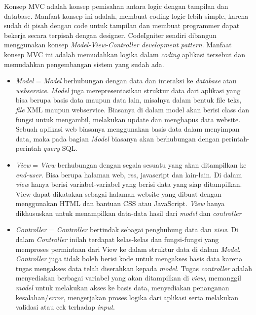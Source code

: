 	Konsep MVC adalah konsep pemisahan antara logic dengan tampilan dan database. Manfaat konsep ini adalah, membuat coding logic lebih simple, karena sudah di pisah dengan code untuk tampilan dan membuat programmer dapat bekerja secara terpisah dengan designer.
	CodeIgniter sendiri dibangun menggunakan konsep \textit{Model-View-Controller development pattern}. Manfaat konsep MVC ini adalah memudahkan logika dalam \textit{coding} aplikasi tersebut dan memudahkan pengembangan sistem yang sudah ada.
	\begin{itemize}
		\item \textit{Model} = \textit{Model} berhubungan dengan data dan interaksi ke \textit{database} atau \textit{webservice}. \textit{Model} juga merepresentasikan struktur data dari aplikasi yang bisa berupa basis data maupun data lain, misalnya dalam bentuk file teks, \textit{file} XML maupun webservice. Biasanya di dalam model akan berisi class dan fungsi untuk mengambil, melakukan update dan menghapus data website. Sebuah
		aplikasi web biasanya menggunakan basis data dalam menyimpan data, maka pada bagian \textit{Model} biasanya akan berhubungan dengan perintah-perintah \textit{query} SQL.
		\item \textit{View} = \textit{View} berhubungan dengan segala sesuatu yang akan ditampilkan ke \textit{end-user}. Bisa berupa halaman web, rss, javascript dan lain-lain. Di dalam \textit{view} hanya berisi variabel-variabel yang berisi data yang siap ditampilkan. View dapat dikatakan sebagai halaman website yang dibuat dengan	menggunakan HTML dan bantuan CSS atau JavaScript. \textit{View} hanya dikhususkan untuk menampilkan data-data hasil dari \textit{model} dan \textit{controller}
		\item \textit{Controller} = \textit{Controller} bertindak sebagai penghubung data dan \textit{view}. Di dalam \textit{Controller} inilah terdapat kelas-kelas dan fungsi-fungsi yang memproses permintaan dari View ke dalam struktur data di dalam \textit{Model}. \textit{Controller} juga tidak boleh berisi kode untuk mengakses basis data karena tugas mengakses data telah diserahkan kepada \textit{model}. Tugas \textit{controller} adalah menyediakan berbagai variabel yang akan ditampilkan di \textit{view}, memanggil \textit{model} untuk melakukan akses ke basis data, menyediakan penanganan kesalahan/\textit{error}, mengerjakan proses logika dari aplikasi serta melakukan validasi atau cek terhadap \textit{input}.
	
	\end{itemize}
	
